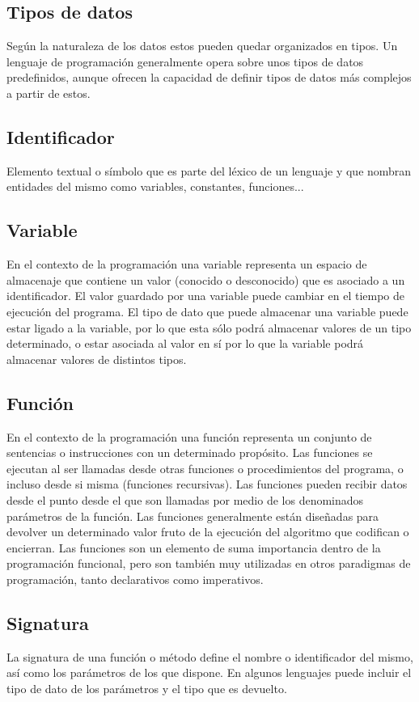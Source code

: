 \subsection{Tipos de datos}
Según la naturaleza de los datos estos pueden quedar organizados en tipos. Un lenguaje de programación generalmente opera sobre unos tipos de datos 
predefinidos, aunque ofrecen la capacidad de definir tipos de datos más complejos a partir de estos.

\subsection{Identificador}
Elemento textual o símbolo que es parte del léxico de un lenguaje y que nombran entidades del mismo como variables, constantes, funciones...

\subsection{Variable}
En el contexto de la programación una variable representa un espacio de almacenaje que contiene un valor (conocido o desconocido) que es asociado a un identificador.
El valor guardado por una variable puede cambiar en el tiempo de ejecución del programa. El tipo de dato que puede almacenar una variable puede estar ligado a la 
variable, por lo que esta sólo podrá almacenar valores de un tipo determinado, o estar asociada al valor en sí por lo que la variable podrá almacenar valores de 
distintos tipos.

\subsection{Función}
En el contexto de la programación una función representa un conjunto de sentencias o instrucciones con un determinado propósito. Las funciones se ejecutan al ser llamadas desde otras
funciones o procedimientos del programa, o incluso desde si misma (funciones recursivas). Las funciones pueden recibir datos desde el punto desde el que son llamadas por medio de los 
denominados parámetros de la función. Las funciones generalmente están diseñadas para devolver un determinado 
valor fruto de la ejecución del algoritmo que codifican o encierran. Las funciones son un elemento de suma importancia dentro de la programación funcional, pero son también muy utilizadas en otros paradigmas de programación, 
tanto declarativos como imperativos. 

\subsection {Signatura}
La signatura de una función o método define el nombre o identificador del mismo, así como los parámetros de los que dispone. En algunos lenguajes puede incluir el tipo de dato de los parámetros 
y el tipo que es devuelto.  

